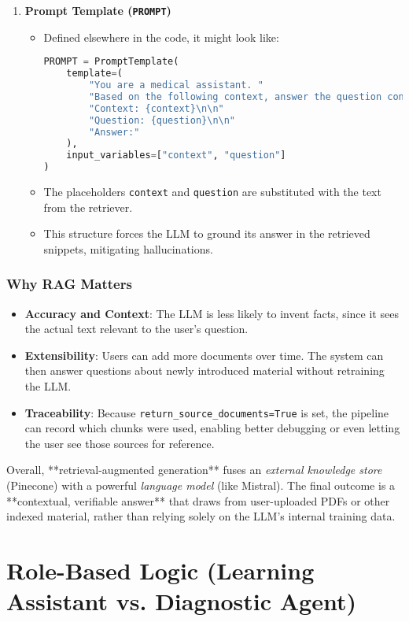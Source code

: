 \begin{enumerate}
    \item \textbf{Prompt Template (\texttt{PROMPT})}
    \begin{itemize}
        \item Defined elsewhere in the code, it might look like:
\begin{lstlisting}[language=Python]
PROMPT = PromptTemplate(
    template=(
        "You are a medical assistant. "
        "Based on the following context, answer the question concisely:\n\n"
        "Context: {context}\n\n"
        "Question: {question}\n\n"
        "Answer:"
    ),
    input_variables=["context", "question"]
)
\end{lstlisting}
        \item The placeholders \texttt{{context}} and \texttt{{question}} are substituted with the text from the retriever. 
        \item This structure forces the LLM to ground its answer in the retrieved snippets, mitigating hallucinations.
    \end{itemize}
\end{enumerate}

\subsubsection*{Why RAG Matters}
\begin{itemize}
    \item \textbf{Accuracy and Context}: The LLM is less likely to invent facts, since it sees the actual text relevant to the user’s question.
    \item \textbf{Extensibility}: Users can add more documents over time. The system can then answer questions about newly introduced material without retraining the LLM.
    \item \textbf{Traceability}: Because \texttt{return\_source\_documents=True} is set, the pipeline can record which chunks were used, enabling better debugging or even letting the user see those sources for reference.
\end{itemize}

\noindent
Overall, **retrieval-augmented generation** fuses an \textit{external knowledge store} (Pinecone) with a powerful \textit{language model} (like Mistral). The final outcome is a **contextual, verifiable answer** that draws from user-uploaded PDFs or other indexed material, rather than relying solely on the LLM’s internal training data.

\section{Role-Based Logic (Learning Assistant vs. Diagnostic Agent)}
\label{sec:role-logic}

